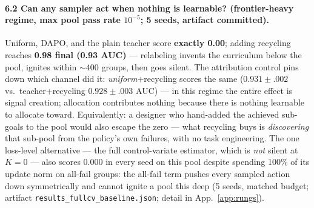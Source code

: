 \paragraph{6.2 Can any sampler act when nothing is learnable? (frontier-heavy regime, max pool pass rate $10^{-5}$; 5 seeds, artifact committed).}
Uniform, DAPO, and the plain teacher score \textbf{exactly 0.00};
adding recycling reaches \textbf{0.98 final (0.93 AUC)} --- relabeling
invents the curriculum below the pool, ignites within ${\sim}400$
groups, then goes silent. The attribution control pins down which
channel did it: \emph{uniform}+recycling scores the same
($0.931{\pm}.002$ vs.\ teacher+recycling $0.928{\pm}.003$ AUC) --- in
this regime the entire effect is signal creation; allocation
contributes nothing because there is nothing learnable to allocate
toward. Equivalently: a designer who hand-added the achieved sub-goals
to the pool would also escape the zero --- what recycling buys is
\emph{discovering} that sub-pool from the policy's own failures, with
no task engineering. The one loss-level alternative --- the full
control-variate estimator, which is \emph{not} silent at $K{=}0$ ---
also scores $0.000$ in every seed on this pool despite spending 100\%
of its update norm on all-fail groups: the all-fail term pushes every
sampled action down symmetrically and cannot ignite a pool this deep
(5 seeds, matched budget; artifact
\texttt{results\_fullcv\_baseline.json}; detail in
App.~\ref{app:rungs}).

